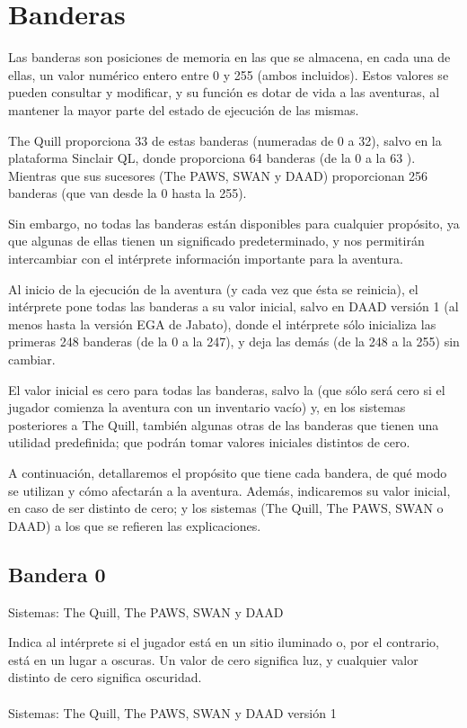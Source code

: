\documentclass[11pt, a5paper]{article}
\newcommand{\quill}{\textsf{The Quill}\xspace}
\newcommand{\paw}{\textsf{The PAWS}\xspace}
\newcommand{\swan}{\textsf{SWAN}\xspace}
\newcommand{\daad}{\textsf{DAAD}\xspace}
\newcommand{\sistemas}[1]{\noindent Sistemas: #1 \nopagebreak}
\begin{document}
\section{Banderas}

Las banderas son posiciones de memoria en las que se almacena, en cada una de ellas, un valor numérico entero entre 0 y 255 (ambos incluidos). Estos valores se pueden consultar y modificar, y su función es dotar de vida a las aventuras, al mantener la mayor parte del estado de ejecución de las mismas.

\quill proporciona 33 de estas banderas (numeradas de 0 a 32), salvo en la plataforma Sinclair QL, donde proporciona 64 banderas (de la 0 a la 63 \cite{QuillQL}). Mientras que sus sucesores (\paw, \swan y \daad) proporcionan 256 banderas (que van desde la 0 hasta la 255).

Sin embargo, no todas las banderas están disponibles para cualquier propósito, ya que algunas de ellas tienen un significado predeterminado, y nos permitirán intercambiar con el intérprete información importante para la aventura.

Al inicio de la ejecución de la aventura (y cada vez que ésta se reinicia), el intérprete pone todas las banderas a su valor inicial, salvo en \daad versión 1 (al menos hasta la versión EGA de Jabato), donde el intérprete sólo inicializa las primeras 248 banderas (de la 0 a la 247), y deja las demás (de la 248 a la 255) sin cambiar.

El valor inicial es cero para todas las banderas, salvo la \textbf{} (que sólo será cero si el jugador comienza la aventura con un inventario vacío) y, en los sistemas posteriores a \quill, también algunas otras de las banderas que tienen una utilidad predefinida; que podrán tomar valores iniciales distintos de cero.

A continuación, detallaremos el propósito que tiene cada bandera, de qué modo se utilizan y cómo afectarán a la aventura. Además, indicaremos su valor inicial, en caso de ser distinto de cero; y los sistemas (\quill, \paw, \swan o \daad) a los que se refieren las explicaciones.

\subsection{Bandera 0}

\sistemas{\quill, \paw, \swan y \daad}

Indica al intérprete si el jugador está en un sitio iluminado o, por el contrario, está en un lugar a oscuras. Un valor de cero significa luz, y cualquier valor distinto de cero significa oscuridad.
\\\ \\
\sistemas{\quill, \paw, \swan y \daad versión 1}
\end{document}
